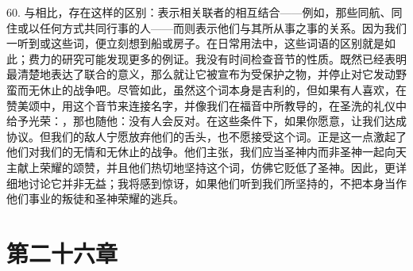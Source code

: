 60. 与相比，存在这样的区别：表示相关联者的相互结合——例如，那些同航、同住或以任何方式共同行事的人——而则表示他们与其所从事之事的关系。因为我们一听到或这些词，便立刻想到船或房子。在日常用法中，这些词语的区别就是如此；费力的研究可能发现更多的例证。我没有时间检查音节的性质。既然已经表明最清楚地表达了联合的意义，那么就让它被宣布为受保护之物，并停止对它发动野蛮而无休止的战争吧。尽管如此，虽然这个词本身是吉利的，但如果有人喜欢，在赞美颂中，用这个音节来连接名字，并像我们在福音中所教导的，在圣洗的礼仪中给予光荣：，那也随他：没有人会反对。在这些条件下，如果你愿意，让我们达成协议。但我们的敌人宁愿放弃他们的舌头，也不愿接受这个词。正是这一点激起了他们对我们的无情和无休止的战争。他们主张，我们应当圣神内而非圣神一起向天主献上荣耀的颂赞，并且他们热切地坚持这个词，仿佛它贬低了圣神。因此，更详细地讨论它并非无益；我将感到惊讶，如果他们听到我们所坚持的，不把本身当作他们事业的叛徒和圣神荣耀的逃兵。\par


\section{第二十六章}

\par

